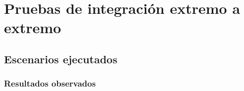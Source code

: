 \section{Pruebas de integración extremo a extremo}
\subsection{Escenarios ejecutados}
\subsubsection{Resultados observados}

